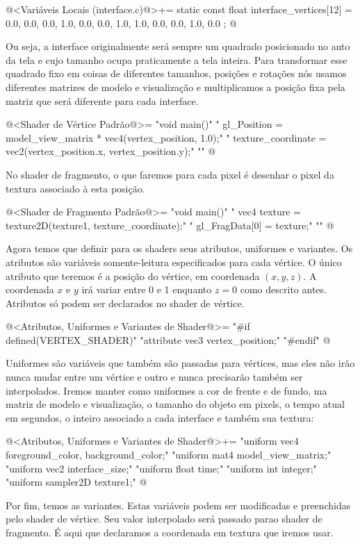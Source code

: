 \iniciocodigo
@<Variáveis Locais (interface.c)@>+=
static const float interface_vertices[12] = {0.0, 0.0, 0.0,
  1.0, 0.0, 0.0, 1.0, 1.0, 0.0, 0.0, 1.0, 0.0 };
@
\fimcodigo

Ou seja, a interface originalmente será sempre um quadrado posicionado
no anto da tela e cujo tamanho ocupa praticamente a tela inteira.
Para transformar esse quadrado fixo em coisas de diferentes tamanhos,
posições e rotações nós usamos diferentes matrizes de modelo e
visualização e multiplicamos a posição fixa pela matriz que será
diferente para cada interface.

\iniciocodigo
@<Shader de Vértice Padrão@>=
"void main(){\n"
"  gl_Position = model_view_matrix * vec4(vertex_position, 1.0);\n"
"  texture_coordinate = vec2(vertex_position.x, vertex_position.y);\n"
"}\n"
@
\fimcodigo

No shader de fragmento, o que faremos para cada pixel é desenhar o
pixel da textura associado à esta posição.

\iniciocodigo
@<Shader de Fragmento Padrão@>=
"void main(){\n"
"  vec4 texture = texture2D(texture1, texture_coordinate);\n"
"  gl_FragData[0] = texture;\n"
"}\n"
@
\fimcodigo

Agora temos que definir para os shaders seus atributos, uniformes e
variantes. Os atributos são variáveis somente-leitura especificados
para cada vértice. O único atributo que teremos é a posição do
vértice, em coordenada $(x, y, z)$. A coordenada $x$ e $y$ irá variar
entre 0 e 1 enquanto $z=0$ como descrito antes. Atributos só podem ser
declarados no shader de vértice.

\iniciocodigo
@<Atributos, Uniformes e Variantes de Shader@>=
"#if defined(VERTEX_SHADER)\n"
"attribute vec3 vertex_position;\n"
"#endif\n"
@
\fimcodigo

Uniformes são variáveis que também são passadas para vértices, mas
eles não irão nunca mudar entre um vértice e outro e nunca precisarão
também ser interpolados. Iremos manter como uniformes a cor de frente
e de fundo, ma matriz de modelo e visualização, o tamanho do objeto em
pixels, o tempo atual em segundos, o inteiro associado a cada
interface e também sua textura:

\iniciocodigo
@<Atributos, Uniformes e Variantes de Shader@>+=
"uniform vec4 foreground_color, background_color;\n"
"uniform mat4 model_view_matrix;\n"
"uniform vec2 interface_size;\n"
"uniform float time;\n"
"uniform int integer;\n"
"uniform sampler2D texture1;\n"
@
\fimcodigo

Por fim, temos as variantes. Estas variáveis podem ser modificadas e
preenchidas pelo shader de vértice. Seu valor interpolado será passado
parao shader de fragmento. É aqui que declaramos a coordenada em
textura que iremos usar.

